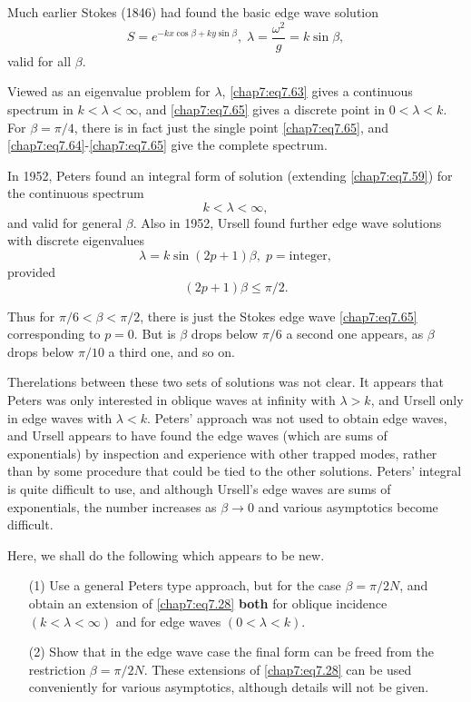 {{Much earlier Stokes (1846) had found the basic edge wave solution
\begin{equation}
S=e^{-kx\cos\beta+ky\sin\beta},\;\lambda=\frac{\omega^2}{g}=k\sin\beta, \tag{7.65}\label{chap7:eq7.65}
\end{equation}
valid for all $\beta$.

Viewed as an eigenvalue problem for $\lambda$, \eqref{chap7:eq7.63} gives a continuous spectrum in $k<\lambda <\infty$, and \eqref{chap7:eq7.65} gives a discrete point in $0<\lambda <k$. For $\beta=\pi/4$, there is in fact just the single point \eqref{chap7:eq7.65}, and \eqref{chap7:eq7.64}-\eqref{chap7:eq7.65} give the complete spectrum. 

In 1952, Peters \cite{key13} found an integral form of solution (extending \eqref{chap7:eq7.59}) for the continuous spectrum 
\begin{equation}
k<\lambda<\infty,\tag{7.66}\label{chap7:eq7.66}
\end{equation}
and valid for general $\beta$. Also in 1952, Ursell found further edge wave solutions with discrete eigenvalues 
\begin{equation}
\lambda=k\sin(2p+1)\beta,\;p=\text{integer},\tag{7.67}\label{chap7:eq7.67}
\end{equation}
provided
$$
(2p+1)\beta\leq\pi/2.
$$

Thus for $\pi/6<\beta<\pi/2$, there is just the Stokes edge wave \eqref{chap7:eq7.65} corresponding to $p=0$. But is $\beta$ drops below $\pi/6$ a second one appears, as $\beta$ drops below $\pi/10$ a third one, and so on.

The\pageoriginale relations between these two sets of solutions was not clear. It appears that Peters was only interested in oblique waves at infinity with $\lambda >k$, and Ursell only in edge waves with $\lambda <k$. Peters' approach was not used to obtain edge waves, and Ursell appears to have found the edge waves (which are sums of exponentials) by inspection and experience with other trapped modes, rather than by some procedure that could be tied to the other solutions. Peters' integral is quite difficult to use, and although Ursell's edge waves are sums of exponentials, the number increases as $\beta\to 0$ and various asymptotics become difficult.

Here, we shall do the following which appears to be new.
\begin{enumerate}
\item [(1)] Use a general Peters type approach, but for the case $\beta=\pi/2N$, and obtain an extension of \eqref{chap7:eq7.28} {\bf both} for oblique incidence $(k<\lambda <\infty)$ and for edge waves $(0<\lambda <k)$.
\item [(2)] Show that in the edge wave case the final form can be freed from the restriction $\beta=\pi/2N$. These extensions of \eqref{chap7:eq7.28} can be used conveniently for various asymptotics, although details will not be given. 
\end{enumerate}

}}

